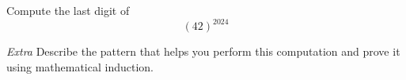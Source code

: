 
Compute the last digit of 
\[
    (42)^{2024}
\]

\vfill

{\it Extra} Describe the pattern that helps you perform this computation 
and prove it using mathematical induction.